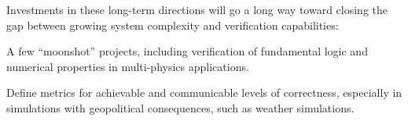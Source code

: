 \noindent Investments in these long-term directions will go a long way toward closing the gap between growing system complexity and verification capabilities:

\begin{compactitem}
\item A few ``moonshot'' projects, including  verification of fundamental logic and numerical properties in 
multi-physics applications.

\item Define   metrics 
for achievable and 
communicable levels of correctness, 
especially in simulations with geopolitical consequences, such as weather simulations.  
\end{compactitem}